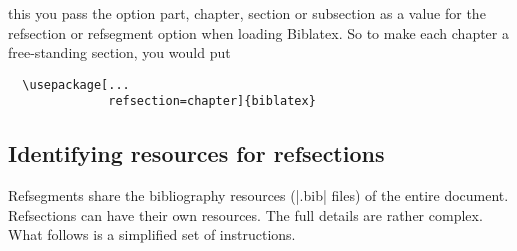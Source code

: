 \begin{enumerate}
  this you pass the option part, chapter, section or subsection as a
  value for the refsection or refsegment option when loading Biblatex.
  So to make each chapter a free-standing section, you would put
  \begin{marginfigure}
  \end{marginfigure}
\begin{Verbatim}
  \usepackage[...
              refsection=chapter]{biblatex}
\end{Verbatim}
\end{enumerate}

\subsection{Identifying resources for refsections}

Refsegments share the bibliography resources (|.bib| files) of the
entire document. Refsections can have their own resources. The full
details are rather complex. What follows is a simplified set of
instructions.

